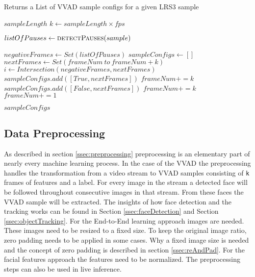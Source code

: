 \begin{algorithm}[tbp]
\caption{}
\label{alg:getSampleConfigs} 
\begin{algorithmic}[1]     %

	\Statex Returns a List of VVAD sample configs for a given LRS3 sample


	\State $sampleLength$ 
	\State $k \gets sampleLength \times fps$ 
		
	\State $listOfPauses \gets \textsc{detectPauses}(sample)$
	
	\State $negativeFrames \gets Set(listOfPauses)$ 
	\State $sampleConfigs \gets []$
		\State $nextFrames \gets Set(frameNum\ to\ frameNum + k)$
		\State $i \gets Intersection(negativeFrames, nextFrames)$ 
    		 
      			\State $sampleConfigs.add([True, nextFrames])$ 
      			\State $frameNum += k$ 
    		\EndCase
      			\State $sampleConfigs.add([False, nextFrames])$ 
      			\State $frameNum += k$ 
		    \EndCase
		    	\State $frameNum += 1$ 
		    \EndCase
		\EndSwitch
	\EndWhile 
	
	\State \Return $sampleConfigs$

\EndProcedure
\end{algorithmic}
\end{algorithm}

\subsection{Data Preprocessing}\label{ssec:dataPreprocessing}
As described in section \ref{ssec:preprocessing} preprocessing is an elementary part of nearly every machine learning process. 
In the case of the VVAD the preprocessing handles the transformation from a video stream to VVAD samples consisting of \texttt{k} frames of features and a label. 
For every image in the stream a detected face will be followed throughout consecutive images in that stream. 
From these faces the VVAD sample will be extracted. 
The insights of how face detection and the tracking works can be found in Section \ref{ssec:faceDetection} and Section \ref{ssec:objectTracking}. 
For the End-to-End learning approach images are needed. 
These images need to be resized to a fixed size. 
To keep the original image ratio, zero padding needs to be applied in some cases.
Why a fixed image size is needed and the concept of zero padding is described in section \ref{ssec:reAndPad}.
For the facial features approach the features need to be normalized.
The preprocessing steps can also be used in live inference.



